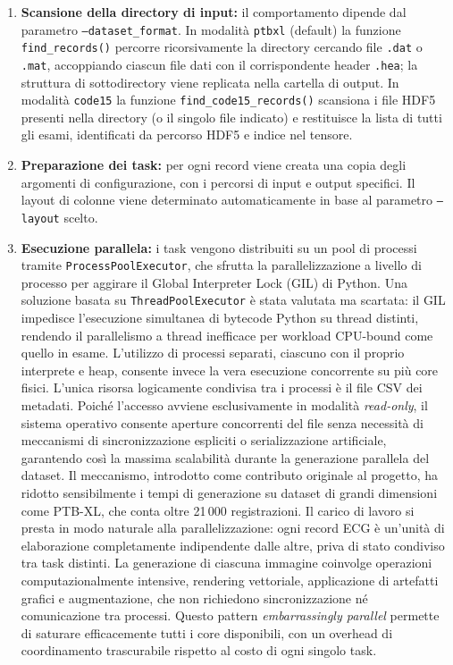 \begin{enumerate}
    \item \textbf{Scansione della directory di input:} il comportamento dipende dal parametro \texttt{--dataset\_format}. In modalità \texttt{ptbxl} (default) la funzione \texttt{find\_records()} percorre ricorsivamente la directory cercando file \texttt{.dat} o \texttt{.mat}, accoppiando ciascun file dati con il corrispondente header \texttt{.hea}; la struttura di sottodirectory viene replicata nella cartella di output. In modalità \texttt{code15} la funzione \texttt{find\_code15\_records()} scansiona i file HDF5 presenti nella directory (o il singolo file indicato) e restituisce la lista di tutti gli esami, identificati da percorso HDF5 e indice nel tensore.
    \item \textbf{Preparazione dei task:} per ogni record viene creata una copia degli argomenti di configurazione, con i percorsi di input e output specifici. Il layout di colonne viene determinato automaticamente in base al parametro \texttt{--layout} scelto.
    \item \textbf{Esecuzione parallela:} i task vengono distribuiti su un pool di processi tramite \texttt{ProcessPoolExecutor}, che sfrutta la parallelizzazione a livello di processo per aggirare il Global Interpreter Lock (GIL) di Python. Una soluzione basata su \texttt{ThreadPoolExecutor} è stata valutata ma scartata: il GIL impedisce l'esecuzione simultanea di bytecode Python su thread distinti, rendendo il parallelismo a thread inefficace per workload CPU-bound come quello in esame. L'utilizzo di processi separati, ciascuno con il proprio interprete e heap, consente invece la vera esecuzione concorrente su più core fisici. L'unica risorsa logicamente condivisa tra i processi è il file CSV dei metadati. Poiché l'accesso avviene esclusivamente in modalità \textit{read-only}, il sistema operativo consente aperture concorrenti del file senza necessità di meccanismi di sincronizzazione espliciti o serializzazione artificiale, garantendo così la massima scalabilità durante la generazione parallela del dataset. Il meccanismo, introdotto come contributo originale al progetto, ha ridotto sensibilmente i tempi di generazione su dataset di grandi dimensioni come PTB-XL, che conta oltre 21\,000 registrazioni. Il carico di lavoro si presta in modo naturale alla parallelizzazione: ogni record ECG è un'unità di elaborazione completamente indipendente dalle altre, priva di stato condiviso tra task distinti. La generazione di ciascuna immagine coinvolge operazioni computazionalmente intensive, rendering vettoriale, applicazione di artefatti grafici e augmentazione, che non richiedono sincronizzazione né comunicazione tra processi. Questo pattern \textit{embarrassingly parallel} permette di saturare efficacemente tutti i core disponibili, con un overhead di coordinamento trascurabile rispetto al costo di ogni singolo task.

\end{enumerate}
